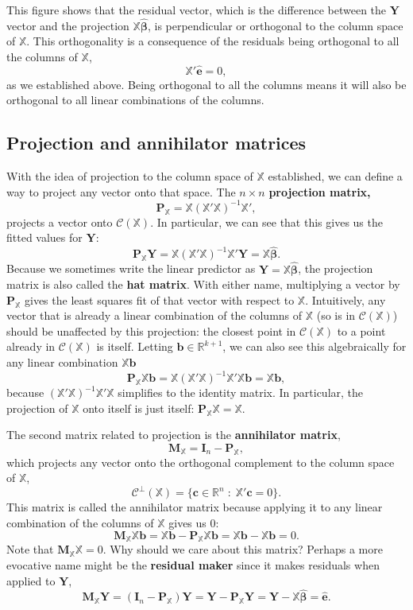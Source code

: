 \documentclass[
  13pt,
  letterpaper,
  DIV=11,
  numbers=noendperiod]{scrreprt}
\newcommand{\mb}{\bm}
\newcommand{\real}{\mathbb{R}}
\newcommand{\Xmat}{\mathbb{X}}
\newcommand{\bhat}{\widehat{\mb{\beta}}}
\theoremstyle{plain}
\theoremstyle{plain}
\theoremstyle{definition}
\theoremstyle{definition}
\theoremstyle{remark}
\begin{document}
This figure shows that the residual vector, which is the difference
between the \(\mb{Y}\) vector and the projection \(\Xmat\bhat\), is
perpendicular or orthogonal to the column space of \(\Xmat\). This
orthogonality is a consequence of the residuals being orthogonal to all
the columns of \(\Xmat\), \[ 
\Xmat'\widehat{\mb{e}} = 0,
\] as we established above. Being orthogonal to all the columns means it
will also be orthogonal to all linear combinations of the columns.

\subsection{Projection and annihilator
matrices}\label{projection-and-annihilator-matrices}

With the idea of projection to the column space of \(\Xmat\)
established, we can define a way to project any vector onto that space.
The \(n\times n\) \textbf{projection matrix,} \[
\mb{P}_{\Xmat} = \Xmat (\Xmat'\Xmat)^{-1} \Xmat',
\] projects a vector onto \(\mathcal{C}(\Xmat)\). In particular, we can
see that this gives us the fitted values for \(\mb{Y}\): \[ 
\mb{P}_{\Xmat}\mb{Y} = \Xmat (\Xmat'\Xmat)^{-1} \Xmat'\mb{Y} = \Xmat\bhat.
\] Because we sometimes write the linear predictor as
\(\widehat{\mb{Y}} = \Xmat\bhat\), the projection matrix is also called
the \textbf{hat matrix}. With either name, multiplying a vector by
\(\mb{P}_{\Xmat}\) gives the least squares fit of that vector with
respect to \(\Xmat\). Intuitively, any vector that is already a linear
combination of the columns of \(\Xmat\) (so is in
\(\mathcal{C}(\Xmat)\)) should be unaffected by this projection: the
closest point in \(\mathcal{C}(\Xmat)\) to a point already in
\(\mathcal{C}(\Xmat)\) is itself. Letting \(\mb{b} \in \real^{k+1}\), we
can also see this algebraically for any linear combination
\(\Xmat\mb{b}\) \[
\mb{P}_{\Xmat}\Xmat\mb{b} = \Xmat (\Xmat'\Xmat)^{-1} \Xmat'\Xmat\mb{b} = \Xmat\mb{b},
\] because \((\Xmat'\Xmat)^{-1} \Xmat'\Xmat\) simplifies to the identity
matrix. In particular, the projection of \(\Xmat\) onto itself is just
itself: \(\mb{P}_{\Xmat}\Xmat = \Xmat\).

The second matrix related to projection is the \textbf{annihilator
matrix}, \[ 
\mb{M}_{\Xmat} = \mb{I}_{n} - \mb{P}_{\Xmat},
\] which projects any vector onto the orthogonal complement to the
column space of \(\Xmat\), \[
\mathcal{C}^{\perp}(\Xmat) = \{\mb{c} \in \mathbb{R}^n\;:\; \Xmat'\mb{c} = 0 \}.
\] This matrix is called the annihilator matrix because applying it to
any linear combination of the columns of \(\Xmat\) gives us 0: \[ 
\mb{M}_{\Xmat}\Xmat\mb{b} = \Xmat\mb{b} - \mb{P}_{\Xmat}\Xmat\mb{b} = \Xmat\mb{b} - \Xmat\mb{b} = 0.
\] Note that \(\mb{M}_{\Xmat}\Xmat = 0\). Why should we care about this
matrix? Perhaps a more evocative name might be the \textbf{residual
maker} since it makes residuals when applied to \(\mb{Y}\), \[ 
\mb{M}_{\Xmat}\mb{Y} = (\mb{I}_{n} - \mb{P}_{\Xmat})\mb{Y} = \mb{Y} - \mb{P}_{\Xmat}\mb{Y} = \mb{Y} - \Xmat\bhat = \widehat{\mb{e}}.
\]
\end{document}

